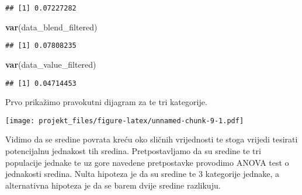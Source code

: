 \documentclass[
]{article}
\newenvironment{Shaded}{\begin{snugshade}}{\end{snugshade}}
\newcommand{\DataTypeTok}[1]{\textcolor[rgb]{0.13,0.29,0.53}{#1}}
\newcommand{\KeywordTok}[1]{\textcolor[rgb]{0.13,0.29,0.53}{\textbf{#1}}}
\newcommand{\NormalTok}[1]{#1}
\newcommand{\OperatorTok}[1]{\textcolor[rgb]{0.81,0.36,0.00}{\textbf{#1}}}
\newcommand{\StringTok}[1]{\textcolor[rgb]{0.31,0.60,0.02}{#1}}
\begin{document}
\begin{verbatim}
## [1] 0.07227282
\end{verbatim}

\begin{Shaded}
\begin{Highlighting}[]
\KeywordTok{var}\NormalTok{(data_blend_filtered)}
\end{Highlighting}
\end{Shaded}

\begin{verbatim}
## [1] 0.07808235
\end{verbatim}

\begin{Shaded}
\begin{Highlighting}[]
\KeywordTok{var}\NormalTok{(data_value_filtered)}
\end{Highlighting}
\end{Shaded}

\begin{verbatim}
## [1] 0.04714453
\end{verbatim}

\pagebreak

Prvo prikažimo pravokutni dijagram za te tri kategorije.

\begin{Shaded}
\end{Shaded}

\texttt{[image: projekt\_files/figure-latex/unnamed-chunk-9-1.pdf]}

Vidimo da se sredine povrata kreću oko sličnih vrijednosti te stoga
vrijedi tesirati potencijalnu jednakost tih sredina. Pretpostavljamo da
su sredine te tri populacije jednake te uz gore navedene pretpostavke
provodimo ANOVA test o jednakosti sredina. Nulta hipoteza je da su
sredine te 3 kategorije jednake, a alternativna hipoteza je da se barem
dvije sredine razlikuju.
\end{document}
